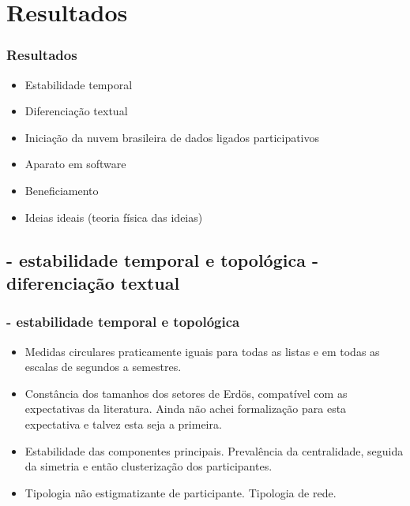 \documentclass[10pt]{beamer}
\begin{document}
\section{Resultados}
\begin{frame}
\frametitle{Resultados}
\begin{itemize}
	\item Estabilidade temporal
	\item Diferenciação textual
	\item Iniciação da nuvem brasileira de dados ligados participativos
	\item Aparato em software
	\item Beneficiamento
	\item Ideias ideais (teoria física das ideias)
\end{itemize}
\end{frame}

\begin{frame}
\subsection{- estabilidade temporal e topológica \;\; - diferenciação textual}
\frametitle{- estabilidade temporal e topológica}
\begin{itemize}
	\item Medidas circulares praticamente iguais para todas as listas e em todas as escalas de segundos a semestres.
	\item Constância dos tamanhos dos setores de Erdös, compatível com as expectativas da literatura. Ainda não achei formalização para esta expectativa e talvez esta seja a primeira.
	\item Estabilidade das componentes principais. Prevalência da centralidade, seguida da simetria e então clusterização dos participantes.
	\item Tipologia não estigmatizante de participante. Tipologia de rede.
\end{itemize}
\end{frame}
\end{document}
